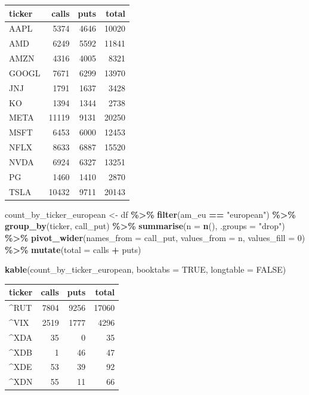 \documentclass[
]{article}
\newenvironment{Shaded}{\begin{snugshade}}{\end{snugshade}}
\newcommand{\AttributeTok}[1]{\textcolor[rgb]{0.13,0.29,0.53}{#1}}
\newcommand{\ConstantTok}[1]{\textcolor[rgb]{0.56,0.35,0.01}{#1}}
\newcommand{\DecValTok}[1]{\textcolor[rgb]{0.00,0.00,0.81}{#1}}
\newcommand{\FunctionTok}[1]{\textcolor[rgb]{0.13,0.29,0.53}{\textbf{#1}}}
\newcommand{\NormalTok}[1]{#1}
\newcommand{\OtherTok}[1]{\textcolor[rgb]{0.56,0.35,0.01}{#1}}
\newcommand{\SpecialCharTok}[1]{\textcolor[rgb]{0.81,0.36,0.00}{\textbf{#1}}}
\newcommand{\StringTok}[1]{\textcolor[rgb]{0.31,0.60,0.02}{#1}}
\begin{document}
\begin{longtable}[]{@{}lrrr@{}}
\toprule\noalign{}
ticker & calls & puts & total \\
\midrule\noalign{}
\endhead
\bottomrule\noalign{}
\endlastfoot
AAPL & 5374 & 4646 & 10020 \\
AMD & 6249 & 5592 & 11841 \\
AMZN & 4316 & 4005 & 8321 \\
GOOGL & 7671 & 6299 & 13970 \\
JNJ & 1791 & 1637 & 3428 \\
KO & 1394 & 1344 & 2738 \\
META & 11119 & 9131 & 20250 \\
MSFT & 6453 & 6000 & 12453 \\
NFLX & 8633 & 6887 & 15520 \\
NVDA & 6924 & 6327 & 13251 \\
PG & 1460 & 1410 & 2870 \\
TSLA & 10432 & 9711 & 20143 \\
\end{longtable}

\begin{Shaded}
\begin{Highlighting}[]
\NormalTok{count\_by\_ticker\_european }\OtherTok{\textless{}{-}}\NormalTok{ df }\SpecialCharTok{\%\textgreater{}\%}
  \FunctionTok{filter}\NormalTok{(am\_eu }\SpecialCharTok{==} \StringTok{"european"}\NormalTok{) }\SpecialCharTok{\%\textgreater{}\%}
  \FunctionTok{group\_by}\NormalTok{(ticker, call\_put) }\SpecialCharTok{\%\textgreater{}\%}
  \FunctionTok{summarise}\NormalTok{(}\AttributeTok{n =} \FunctionTok{n}\NormalTok{(), }\AttributeTok{.groups =} \StringTok{"drop"}\NormalTok{) }\SpecialCharTok{\%\textgreater{}\%}
  \FunctionTok{pivot\_wider}\NormalTok{(}\AttributeTok{names\_from =}\NormalTok{ call\_put, }\AttributeTok{values\_from =}\NormalTok{ n, }\AttributeTok{values\_fill =} \DecValTok{0}\NormalTok{) }\SpecialCharTok{\%\textgreater{}\%}
  \FunctionTok{mutate}\NormalTok{(}\AttributeTok{total =}\NormalTok{ calls }\SpecialCharTok{+}\NormalTok{ puts)}

\FunctionTok{kable}\NormalTok{(count\_by\_ticker\_european, }\AttributeTok{booktabs =} \ConstantTok{TRUE}\NormalTok{, }\AttributeTok{longtable =} \ConstantTok{FALSE}\NormalTok{)}
\end{Highlighting}
\end{Shaded}

\begin{longtable}[]{@{}lrrr@{}}
\toprule\noalign{}
ticker & calls & puts & total \\
\midrule\noalign{}
\endhead
\bottomrule\noalign{}
\endlastfoot
\^{}RUT & 7804 & 9256 & 17060 \\
\^{}VIX & 2519 & 1777 & 4296 \\
\^{}XDA & 35 & 0 & 35 \\
\^{}XDB & 1 & 46 & 47 \\
\^{}XDE & 53 & 39 & 92 \\
\^{}XDN & 55 & 11 & 66 \\
\end{longtable}
\end{document}
